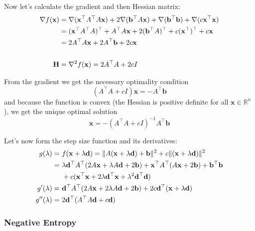 \documentclass[a4paper,english,titlepage,12pt]{article}
\newcommand{\vect}[1]{\ensuremath{\mathbf{#1}}}
\newcommand{\trans}[1]{\ensuremath\vect{#1}^\top}
\newcommand{\norm}[1]{\ensuremath\Vert #1 \Vert}
\begin{document}
Now let's calculate the gradient and then Hessian matrix:
\begin{align}
    \nabla f(\vect{x}) &= \nabla(\trans{x} A^\top A \vect{x}) + 2 \nabla(\trans{b} A \vect{x}) + \nabla(\trans{b} \vect{b}) + \nabla(c \trans{x} \vect{x}) \nonumber \\
    &= (\trans{x} A^\top A)^\top + A^\top A \vect{x} + 2 (\trans{b} A)^\top + c (\trans{x})^\top + c \vect{x} \nonumber \\
    &= 2 A^\top A \vect{x} + 2 A^\top \vect{b} + 2 c \vect{x} \\
    &\nonumber \\
    \textbf{H} &= \nabla^2 f(\vect{x}) = 2 A^\top A + 2 c I
\end{align}

From the gradient we get the necessary optimality condition
\begin{equation}
    (A^\top A + c I) \vect{x} = - A^\top \vect{b}
\end{equation}
and because the function is convex (the Hessian is positive definite for all $\vect{x} \in \mathbb{R}^n$), we get the unique optimal solution
\begin{equation}
    \vect{x} = - (A^\top A + c I)^{-1} A^\top \vect{b}
\end{equation}

Let's now form the step size function and its derivatives:
\begin{align}
    g(\lambda) =\ &f(\vect{x} + \lambda \vect{d}) = \norm{A (\vect{x} + \lambda \vect{d}) + \vect{b}} ^ 2 + c \norm{(\vect{x} + \lambda \vect{d})} ^ 2 \nonumber \\
    =\ &\lambda \trans{d} A^\top ( 2 A \vect{x} + \lambda A \vect{d} + 2 \vect{b}) + \trans{x} A^\top ( A \vect{x} + 2 \vect{b} ) + \trans{b} \vect{b} \\
    &+ c ( \trans{x} \vect{x} + 2 \lambda \trans{d} \vect{x} + \lambda ^ 2 \trans{d} \vect{d}) \nonumber \\
    g'(\lambda) =\ &\trans{d} A^\top ( 2 A \vect{x} + 2 \lambda A \vect{d} + 2 \vect{b} ) + 2 c \trans{d} ( \vect{x} + \lambda \vect{d} ) \\
    g''(\lambda) =\ &2 \trans{d} ( A^\top A \vect{d} + c \vect{d})
\end{align}


\subsubsection{Negative Entropy}
\end{document}
